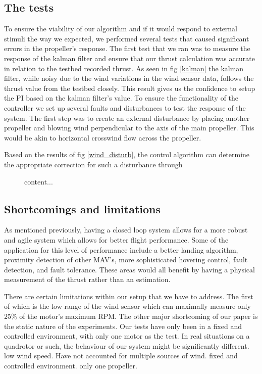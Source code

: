 \documentclass[conference]{IEEEtran}
\begin{document}
	\subsection{The tests}
	To ensure the viability of our algorithm and if it would respond to external stimuli the way we expected, we performed several tests that caused significant errors in the propeller's response. The first test that we ran was to measure the response of the kalman filter and ensure that our thrust calculation was accurate in relation to the testbed recorded thrust. As seen in fig \ref{kalman} the kalman filter, while noisy due to the wind variations in the wind sensor data, follows the thrust value from the testbed closely. This result gives us the confidence to setup the PI based on the kalman filter's value. 
	To ensure the functionality of the controller we set up several faults and disturbances to test the response of the system. The first step was to create an external disturbance by placing another propeller and blowing wind perpendicular to the axis of the main propeller. This would be akin to horizontal crosswind flow across the propeller.
	\begin{figure}
		\label{content...}
	\end{figure}
	 Based on the results of fig \ref{wind_disturb}, the control algorithm can determine the appropriate correction for such a disturbance through
	\begin{figure}
		content...
	\end{figure}
	\subsection{Shortcomings and limitations}
	As mentioned previously, having a closed loop system allows for a more robust and agile system which allows for better flight performance. Some of the application for this level of performance include a better landing algorithm, proximity detection of other MAV's, more sophisticated hovering control, fault detection, and fault tolerance. These areas would all benefit by having a physical measurement of the thrust rather than an estimation.
	
	There are certain limitations within our setup that we have to address. The first of which is the low range of the wind sensor which can maximally measure only $25\%$ of the motor's maximum RPM. The other major shortcoming of our paper is the static nature of the experiments. Our tests have only been in a fixed and controlled environment, with only one motor as the test. In real situations on a quadrotor or such, the behaviour of our system might be significantly different.  	
	low wind speed. Have not accounted for multiple sources of wind. fixed and controlled environment. only one propeller. 
\end{document}
